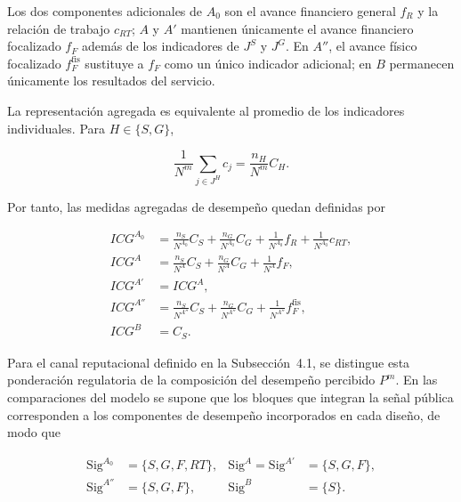Los dos componentes adicionales de \(A_0\) son el avance financiero general \(f_R\) y la relación de trabajo \(c_{RT}\); \(A\) y \(A'\) mantienen únicamente el avance financiero focalizado \(f_F\) además de los indicadores de \(J^{S}\) y \(J^{G}\). En \(A''\), el avance físico focalizado \(f_F^{\mathrm{fis}}\) sustituye a \(f_F\) como un único indicador adicional; en \(B\) permanecen únicamente los resultados del servicio.

La representación agregada es equivalente al promedio de los indicadores individuales. Para \(H\in\{S,G\}\),

\begin{equation}
\label{eq:equivalencia_promedio_bloques}
\frac{1}{N^m}
\sum_{j\in J^{H}}c_j
=
\frac{n_H}{N^m}C_H.
\end{equation}

Por tanto, las medidas agregadas de desempeño quedan definidas por

\begin{subequations}
\label{eq:icg_esquemas}
\begin{align}
ICG^{A_0} &= \frac{n_S}{N^{A_0}}C_S+\frac{n_G}{N^{A_0}}C_G+\frac{1}{N^{A_0}}f_R+\frac{1}{N^{A_0}}c_{RT},
\label{eq:icg_a0_esquemas}\\
ICG^{A} &= \frac{n_S}{N^{A}}C_S+\frac{n_G}{N^{A}}C_G+\frac{1}{N^{A}}f_F,
\label{eq:icg_a}\\
ICG^{A'} &= ICG^{A},
\label{eq:icg_ap}\\
ICG^{A''} &= \frac{n_S}{N^{A''}}C_S+\frac{n_G}{N^{A''}}C_G+\frac{1}{N^{A''}}f_F^{\mathrm{fis}},
\label{eq:icg_app}\\
ICG^{B} &= C_S.
\label{eq:icg_b}
\end{align}
\end{subequations}

Para el canal reputacional definido en la Subsección~4.1, se distingue esta ponderación regulatoria de la composición del desempeño percibido \(P^m\). En las comparaciones del modelo se supone que los bloques que integran la señal pública corresponden a los componentes de desempeño incorporados en cada diseño, de modo que

\begin{equation}
\label{eq:bloques_reputacionales_esquemas}
\begin{aligned}
\mathrm{Sig}^{A_0}
&=
\{S,G,F,RT\},
&
\mathrm{Sig}^{A}
=
\mathrm{Sig}^{A'}
&=
\{S,G,F\},
\\
\mathrm{Sig}^{A''}
&=
\{S,G,F\},
&
\mathrm{Sig}^{B}
&=
\{S\}.
\end{aligned}
\end{equation}

